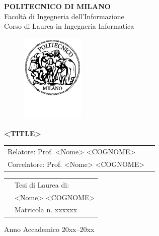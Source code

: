 \documentclass[a4paper]{report}
\begin{document}
\begin{titlepage}

\begin{center}
\LARGE
\textbf{POLITECNICO DI MILANO} \\
\Large
Facolt\`a di Ingegneria dell'Informazione \\
Corso di Laurea in Ingegneria Informatica
\end{center}

\addvspace{1.5cm}
\begin{figure}[h]
\begin{center}
\includegraphics[width=3cm]{figures/PoliMi}
\end{center}
\end{figure}

\addvspace{0.75cm}
\begin{center}
\LARGE
\textbf{<TITLE>}
\end{center}

\addvspace{4cm}
\Large
\begin{center}
\begin{tabular}{p{}p{}}
Relatore: Prof. <Nome> <COGNOME> & \\
Correlatore: Prof. <Nome> <COGNOME> & \\
\end{tabular}
\end{center}

\addvspace{2cm}
\Large
\begin{center}
\begin{tabular}{p{}p{}}
& Tesi di Laurea di: \\
& <Nome> <COGNOME> \\
& Matricola n. xxxxxx
\end{tabular}
\end{center}

\vfill
\Large
\begin{center}
Anno Accademico 20xx--20xx
\end{center}

\end{titlepage}
\end{document}
